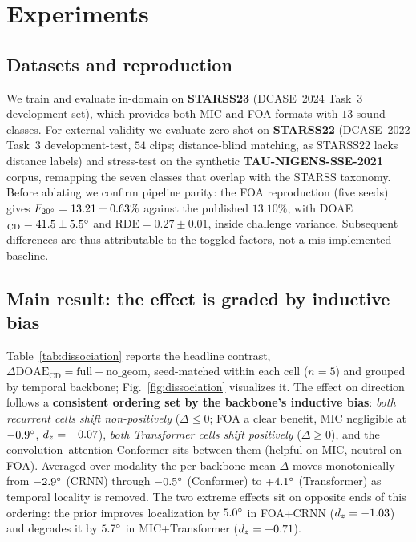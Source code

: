 \section{Experiments}
\label{sec:experiments}

\subsection{Datasets and reproduction}
\label{sec:datasets}
We train and evaluate in-domain on \textbf{STARSS23} (DCASE~2024 Task~3
development set), which provides both MIC and FOA formats with $13$ sound
classes. For external validity we evaluate zero-shot on \textbf{STARSS22}
(DCASE~2022 Task~3 development-test, $54$ clips; distance-blind matching, as
STARSS22 lacks distance labels) and stress-test on the synthetic
\textbf{TAU-NIGENS-SSE-2021} corpus, remapping the seven classes that overlap
with the STARSS taxonomy. Before ablating we confirm pipeline parity: the FOA
reproduction (five seeds) gives $F_{20^\circ}=13.21\pm0.63\%$ against the
published $13.10\%$, with DOAE$_\mathrm{CD}=41.5\pm5.5^\circ$ and
RDE$=0.27\pm0.01$, inside challenge variance. Subsequent differences are thus
attributable to the toggled factors, not a mis-implemented baseline.
\label{sec:repro}

\subsection{Main result: the effect is graded by inductive bias}
\label{sec:main}
Table~\ref{tab:dissociation} reports the headline contrast,
$\Delta\text{DOAE}_\mathrm{CD}=\text{full}-\text{no\_geom}$, seed-matched within
each cell ($n=5$) and grouped by temporal backbone; Fig.~\ref{fig:dissociation}
visualizes it. The effect on direction follows a \textbf{consistent ordering set
by the backbone's inductive bias}: \emph{both recurrent cells shift
non-positively} ($\Delta\le0$; FOA a clear benefit, MIC negligible at
$-0.9^\circ$, $d_z=-0.07$), \emph{both Transformer cells shift positively}
($\Delta\ge0$), and the convolution--attention Conformer sits between them
(helpful on MIC, neutral on FOA). Averaged over modality the per-backbone mean $\Delta$ moves monotonically
from $-2.9^\circ$ (CRNN) through $-0.5^\circ$ (Conformer) to $+4.1^\circ$
(Transformer) as temporal locality is removed. The two extreme effects sit on
opposite ends of this ordering: the prior improves localization by $5.0^\circ$
in FOA+CRNN ($d_z=-1.03$) and degrades it by $5.7^\circ$ in MIC+Transformer
($d_z=+0.71$).

